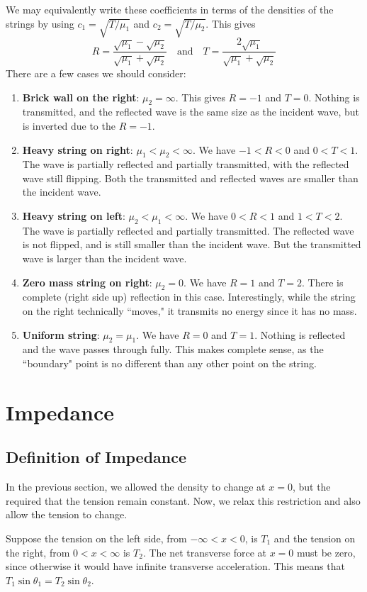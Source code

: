 We may equivalently write these coefficients in terms of the densities of the strings by using $c_1 =\sqrt{T/\mu_1}$ and $c_2 = \sqrt{T/\mu_2}$. This gives
\[ R = \frac{\sqrt{\mu_1} - \sqrt{\mu_2}}{\sqrt{\mu_1} + \sqrt{\mu_2}}\quad\text{and}\quad T = \frac{2\sqrt{\mu_1}}{\sqrt{\mu_1} + \sqrt{\mu_2}}\]
There are a few cases we should consider:
\begin{enumerate}
    \item \textbf{Brick wall on the right}: $\mu_2 = \infty$. This gives $R = -1$ and $T=0$. Nothing is transmitted, and the reflected wave is the same size as the incident wave, but is inverted due to the $R=-1$.
    \item \textbf{Heavy string on right}: $\mu_1 < \mu_2 < \infty$. We have $-1 < R < 0$ and $0 < T < 1$. The wave is partially reflected and partially transmitted, with the reflected wave still flipping. Both the transmitted and reflected waves are smaller than the incident wave.
    \item \textbf{Heavy string on left}: $\mu_2 < \mu_1 < \infty$. We have $0 < R < 1$ and $1<T<2$. The wave is partially reflected and partially transmitted. The reflected wave is not flipped, and is still smaller than the incident wave. But the transmitted wave is larger than the incident wave.
    \item \textbf{Zero mass string on right}: $\mu_2 = 0$. We have $R = 1$ and $T=2$. There is complete (right side up) reflection in this case. Interestingly, while the string on the right technically ``moves," it transmits no energy since it has no mass.
    \item \textbf{Uniform string}: $\mu_2 = \mu_1$. We have $R=0$ and $T=1$. Nothing is reflected and the wave passes through fully. This makes complete sense, as the ``boundary" point is no different than any other point on the string.    
\end{enumerate}
\section{Impedance}
\subsection*{Definition of Impedance}
In the previous section, we allowed the density to change at $x=0$, but the required that the tension remain constant. Now, we relax this restriction and also allow the tension to change.

Suppose the tension on the left side, from $-\infty < x < 0$, is $T_1$ and the tension on the right, from $0 < x < \infty$ is $T_2$. The net transverse force at $x=0$ must be zero, since otherwise it would have infinite transverse acceleration. This means that $T_1\sin\theta_1 = T_2\sin\theta_2$. 

